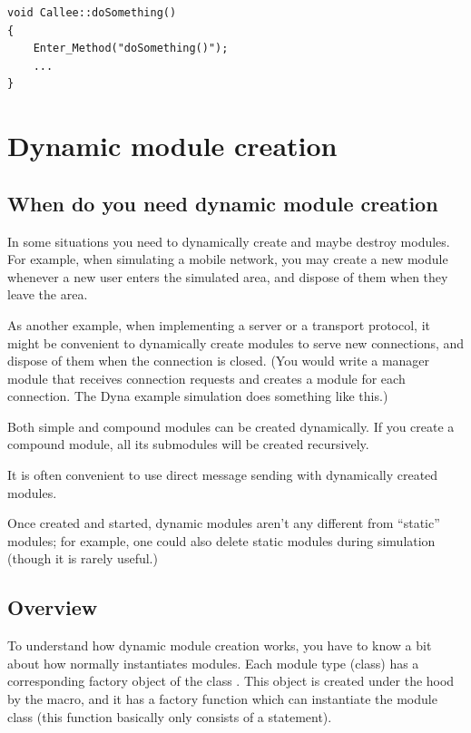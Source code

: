 \begin{verbatim}
void Callee::doSomething()
{
    Enter_Method("doSomething()");
    ...
}
\end{verbatim}



\section{Dynamic module creation}
\label{sec:simple-modules:dynamic-module-creation}

\subsection{When do you need dynamic module creation}

In some situations you need to dynamically create and maybe destroy
modules. For example, when simulating a mobile network,
you may create a new module whenever a new user enters
the simulated area, and dispose of them when they leave the area.

As another example, when implementing a server or a transport
protocol, it might be convenient to dynamically create modules
to serve new connections, and dispose of them when the connection
is closed. (You would write a manager module that receives connection
requests and creates a module for each connection.
The Dyna example simulation does something like this.)

Both simple and compound modules can be created dynamically.
If you create a compound module, all its submodules will be created
recursively.

It is often convenient to use direct message sending with dynamically
created modules.

Once created and started, dynamic modules aren't any different from
``static'' modules; for example, one could also delete static modules
during simulation (though it is rarely useful.)


\subsection{Overview}


To understand how dynamic module creation works, you have to know a
bit about how normally {\opp} instantiates modules. Each module type
(class) has a corresponding factory object of the class
. This object is created under the hood by the
 macro, and it has a factory
function which can instantiate the module
class (this function basically only consists of a  statement).

